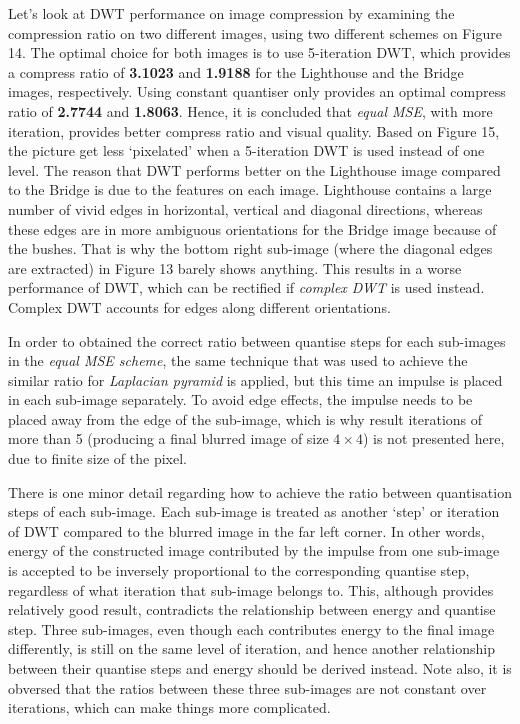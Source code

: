 \documentclass[a4paper, 11pt]{article}
\begin{document}
Let's look at DWT performance on image compression by examining the compression ratio on two different images, using two different schemes on Figure 14. The optimal choice for both images is to use 5-iteration DWT, which provides a compress ratio of \textbf{3.1023} and \textbf{1.9188} for the Lighthouse and the Bridge images, respectively. Using constant quantiser only provides an optimal compress ratio of \textbf{2.7744} and \textbf{1.8063}. Hence, it is concluded that \textit{equal MSE}, with more iteration, provides better compress ratio and visual quality. Based on Figure 15, the picture get less `pixelated' when a 5-iteration DWT is used instead of one level. The reason that DWT performs better on the Lighthouse image compared to the Bridge is due to the features on each image. Lighthouse contains a large number of vivid edges in horizontal, vertical and diagonal directions, whereas these edges are in more ambiguous orientations for the Bridge image because of the bushes. That is why the bottom right sub-image (where the diagonal edges are extracted) in Figure 13 barely shows anything. This results in a worse performance of DWT, which can be rectified if \textit{complex DWT} is used instead. Complex DWT accounts for edges along different orientations. 

In order to obtained the correct ratio between quantise steps for each sub-images in the \textit{equal MSE scheme}, the same technique that was used to achieve the similar ratio for \textit{Laplacian pyramid} is applied, but this time an impulse is placed in each sub-image separately. To avoid edge effects, the impulse needs to be placed away from the edge of the sub-image, which is why result iterations of more than 5 (producing a final blurred image of size $4 \times 4$) is not presented here, due to finite size of the pixel.

There is one minor detail regarding how to achieve the ratio between quantisation steps of each sub-image. Each sub-image is treated as another `step' or iteration of DWT compared to the blurred image in the far left corner. In other words, energy of the constructed image contributed by the impulse from one sub-image is accepted to be inversely proportional to the corresponding quantise step, regardless of what iteration that sub-image belongs to. This, although provides relatively good result, contradicts the relationship between energy and quantise step. Three sub-images, even though each contributes energy to the final image differently, is still on the same level of iteration, and hence another relationship between their quantise steps and energy should be derived instead. Note also, it is obversed that the ratios between these three sub-images are not constant over iterations, which can make things more complicated.
\end{document}
